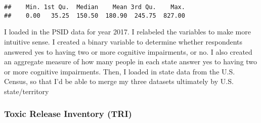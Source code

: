 \documentclass[
]{article}
\newenvironment{Shaded}{\begin{snugshade}}{\end{snugshade}}
\newcommand{\AttributeTok}[1]{\textcolor[rgb]{0.13,0.29,0.53}{#1}}
\newcommand{\CommentTok}[1]{\textcolor[rgb]{0.56,0.35,0.01}{\textit{#1}}}
\newcommand{\FunctionTok}[1]{\textcolor[rgb]{0.13,0.29,0.53}{\textbf{#1}}}
\newcommand{\NormalTok}[1]{#1}
\newcommand{\OtherTok}[1]{\textcolor[rgb]{0.56,0.35,0.01}{#1}}
\newcommand{\SpecialCharTok}[1]{\textcolor[rgb]{0.81,0.36,0.00}{\textbf{#1}}}
\newcommand{\StringTok}[1]{\textcolor[rgb]{0.31,0.60,0.02}{#1}}
\begin{document}
\begin{Shaded}
\end{Shaded}

\begin{verbatim}
##    Min. 1st Qu.  Median    Mean 3rd Qu.    Max. 
##    0.00   35.25  150.50  180.90  245.75  827.00
\end{verbatim}

\begin{Shaded}
\end{Shaded}

I loaded in the PSID data for year 2017. I relabeled the variables to
make more intuitive sense. I created a binary variable to determine
whether respondents answered yes to having two or more cognitive
impairments, or no. I also created an aggregate measure of how many
people in each state answer yes to having two or more cognitive
impairments. Then, I loaded in state data from the U.S. Census, so that
I'd be able to merge my three datasets ultimately by U.S.
state/territory

\hypertarget{toxic-release-inventory-tri}{%
\subsubsection{Toxic Release Inventory
(TRI)}\label{toxic-release-inventory-tri}}
\end{document}
